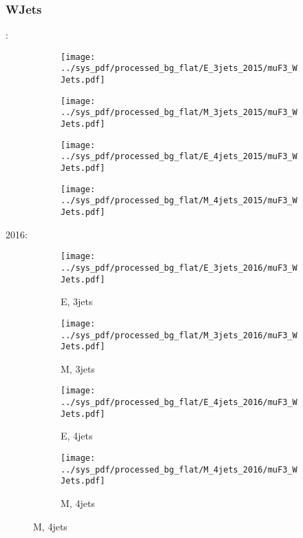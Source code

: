 \documentclass{beamer}
\begin{document}
\begin{frame}
\frametitle{WJets}
\fontsize{5}{1}:
\begin{figure}
\centering
\begin{subfigure}[b]{0.24\textwidth}
\texttt{[image: ../sys\_pdf/processed\_bg\_flat/E\_3jets\_2015/muF3\_WJets.pdf]}
\end{subfigure}
\begin{subfigure}[b]{0.24\textwidth}
\texttt{[image: ../sys\_pdf/processed\_bg\_flat/M\_3jets\_2015/muF3\_WJets.pdf]}
\end{subfigure}
\begin{subfigure}[b]{0.24\textwidth}
\texttt{[image: ../sys\_pdf/processed\_bg\_flat/E\_4jets\_2015/muF3\_WJets.pdf]}
\end{subfigure}
\begin{subfigure}[b]{0.24\textwidth}
\texttt{[image: ../sys\_pdf/processed\_bg\_flat/M\_4jets\_2015/muF3\_WJets.pdf]}
\end{subfigure}
\end{figure}
2016:
\begin{figure}
\centering
\begin{subfigure}[b]{0.24\textwidth}
\texttt{[image: ../sys\_pdf/processed\_bg\_flat/E\_3jets\_2016/muF3\_WJets.pdf]}
\captionsetup{font=tiny}
\caption{E, 3jets}
\end{subfigure}
\begin{subfigure}[b]{0.24\textwidth}
\texttt{[image: ../sys\_pdf/processed\_bg\_flat/M\_3jets\_2016/muF3\_WJets.pdf]}
\captionsetup{font=tiny}
\caption{M, 3jets}
\end{subfigure}
\begin{subfigure}[b]{0.24\textwidth}
\texttt{[image: ../sys\_pdf/processed\_bg\_flat/E\_4jets\_2016/muF3\_WJets.pdf]}
\captionsetup{font=tiny}
\caption{E, 4jets}
\end{subfigure}
\begin{subfigure}[b]{0.24\textwidth}
\texttt{[image: ../sys\_pdf/processed\_bg\_flat/M\_4jets\_2016/muF3\_WJets.pdf]}
\captionsetup{font=tiny}
\caption{M, 4jets}
\end{subfigure}
\end{figure}
\end{frame}
\end{document}
